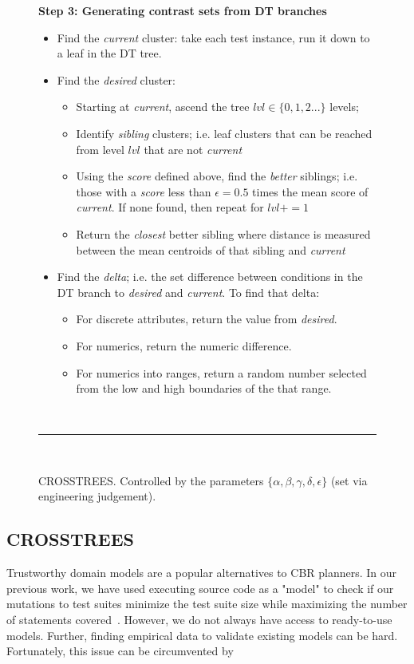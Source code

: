 \documentclass{sig-alternate}
\newcommand{\bi}{\begin{itemize}[leftmargin=0.4cm]}
\newcommand{\ei}{\end{itemize}}
\begin{document}
\begin{figure}[t]
	{\bf Step 3: Generating contrast sets from DT branches}
	\begin{itemize}
		\item Find the {\em current } cluster: take each test instance, run it down to a leaf in the DT tree.  
		\item Find the {\em desired} cluster: 
		\bi
		\item Starting at {\em current}, ascend the tree $lvl\in \{0,1,2...\}$ levels;
		\item Identify {\em sibling} clusters; i.e. leaf clusters that can be reached from level $lvl$ that are not {\em current }
		\item Using the {\em score} defined above, find the {\em better} siblings; i.e. those with a {\em score} less than $\epsilon=0.5$ times the mean score of {\em current}. If none found, then repeat for $lvl += 1$
		\item  Return the {\em closest} better sibling where distance is measured between the mean centroids of that sibling and {\em current}
		\ei
		\item Find the {\em delta}; i.e. the set difference between  conditions in the DT branch to {\em desired} and {\em current}. To find that delta:
		\bi
		\item
		For discrete attributes,  return the value from {\em desired}. 
		\item
		For  numerics, return the numeric difference. 
		\item
		For numerics  into ranges, return a random number selected from the low and high boundaries of the that range.
		\ei
		\ei
		~\hrule~
		\caption{CROSSTREES. Controlled by the parameters
			$\{\alpha, \beta, \gamma, \delta, \epsilon\}$ (set via engineering judgement).}
		\label{fig:xtrees_bare}
	\end{figure}



\subsection{CROSSTREES}

Trustworthy domain models are a popular alternatives to CBR planners. In our previous work, we have used executing source code as a "model" to check if our mutations to test suites minimize the test suite size while maximizing the number of statements covered~\cite{me09m,andrews07,andrews10}. However, we do not always have access to ready-to-use models. Further, finding empirical data to validate existing models can be hard. Fortunately, this issue can be circumvented by 
\end{document}

